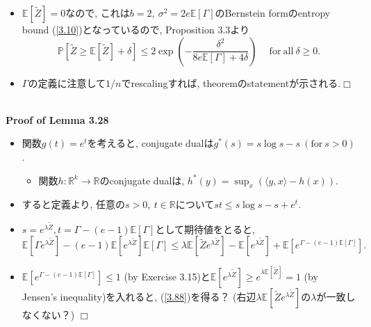 \documentclass[aspectratio=169, dvipdfmx]{beamer}
\def\qed{\hfill $\Box$}
\newcommand{\ex}{\mathbb{E}}
\newcommand{\bb}{\mathbb}
\begin{document}
\begin{frame}
    \begin{itemize}
        \item $\ex[\widetilde{Z}] = 0$なので, これは$b = 2,\ \sigma^2 = 2e\ex[\Gamma]$のBernstein formのentropy bound (\ref{3.10})となっているので,
        Proposition 3.3より
        \[
            \bb{P}\left[\widetilde{Z} \ge \ex[\widetilde{Z}] +\delta\right]
            \le 2 \exp\left(-\frac{\delta^2}{8e\ex[\Gamma] + 4\delta} \right)
            \quad \mathrm{\ for\ all\ } \delta \ge 0.
        \]
        \item $\Gamma$の定義に注意して$1/n$でrescalingすれば, theoremのstatementが示される.\qed
    \end{itemize}
　\\
{\bf Proof of Lemma 3.28}
\begin{itemize}
    \item 関数$g(t) = e^t$を考えると, conjugate dualは$g^*(s) = s\log s - s\ (\mathrm{for\ }s>0)$.
        \begin{itemize}
            \item 関数$h:\bb{R}^k\to\bb{R}$のconjugate dualは, $h^*(y) = \sup_{x}\left(\langle y, x\rangle - h(x) \right)$.
        \end{itemize}
    \item すると定義より, 任意の$s > 0,\ t\in \bb{R}$について$st \le s\log s - s + e^t$.
    \item $s = e^{\lambda \widetilde{Z}}, t = \Gamma - (e-1) \ex[\Gamma]$として期待値をとると,
    \[
        \ex[\Gamma e^{\lambda \widetilde{Z}}] - (e-1) \ex[e^{\lambda \widetilde{Z}}]\ex[\Gamma]
        \le \lambda\ex[\widetilde{Z} e^{\lambda \widetilde{Z}}] - \ex[e^{\lambda \widetilde{Z}}] + \ex[e^{\Gamma - (e-1) \ex[\Gamma]}].
    \]
    \item $\ex[e^{\Gamma - (e-1)\ex[\Gamma]}] \le 1$ (by Exercise 3.15)と$\ex[e^{\lambda \widetilde{Z}}] \ge e^{\lambda \ex[\widetilde{Z}]} = 1$ (by Jensen's inequality)を入れると, (\ref{3.88})を得る？ (右辺$\lambda\ex[\widetilde{Z} e^{\lambda \widetilde{Z}}]$の$\lambda$が一致しなくない？)
    \qed
\end{itemize}
\end{frame}
\end{document}
